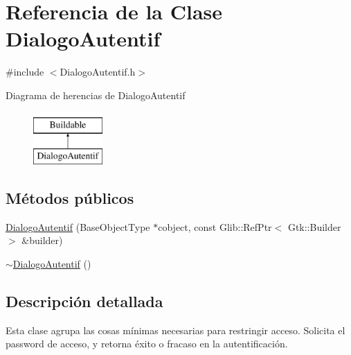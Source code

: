 \hypertarget{classDialogoAutentif}{\section{\-Referencia de la \-Clase \-Dialogo\-Autentif}
\label{classDialogoAutentif}
}


{\ttfamily \#include $<$\-Dialogo\-Autentif.\-h$>$}

\-Diagrama de herencias de \-Dialogo\-Autentif\begin{figure}[H]
\begin{center}
\leavevmode
\includegraphics[height=2.000000cm]{classDialogoAutentif}
\end{center}
\end{figure}
\subsection*{\-Métodos públicos}
\begin{DoxyCompactItemize}
\item 
\hyperlink{classDialogoAutentif_a249ccc61d65b6f2648fa2d6ab45e9031}{\-Dialogo\-Autentif} (\-Base\-Object\-Type $\ast$cobject, const \-Glib\-::\-Ref\-Ptr$<$ \-Gtk\-::\-Builder $>$ \&builder)
\item 
\hyperlink{classDialogoAutentif_a8c721f31adfd29a1d82647aac2d79b8b}{$\sim$\-Dialogo\-Autentif} ()
\end{DoxyCompactItemize}


\subsection{\-Descripción detallada}
\-Esta clase agrupa las cosas mínimas necesarias para restringir acceso. \-Solicita el password de acceso, y retorna éxito o fracaso en la autentificación. 


